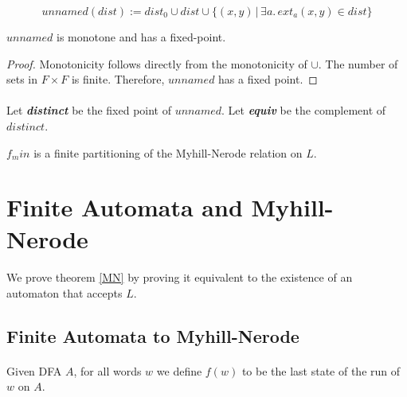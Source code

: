 \begin{definition}
    \begin{equation*}
        unnamed(dist) := dist_0 \cup dist \cup \{ (x,y) \, | \, \exists a. \, ext_a(x,y) \in dist\}
    \end{equation*}
\end{definition}

\begin{lemma}
    \label{dist_monotone}
    $unnamed$ is monotone and has a fixed-point.
\end{lemma}
\begin{proof}
    Monotonicity follows directly from the monotonicity of $\cup$. 
    The number of sets in $F \times F$ is finite. 
    Therefore, $unnamed$ has a fixed point.

\end{proof}
\paragraph{}
Let \textit{\textbf{distinct}} be the fixed point of $unnamed$.
Let \textit{\textbf{equiv}} be the complement of $distinct$.
\begin{theorem}
    \label{MN_MIN}
    $f_min$ is a finite partitioning of the Myhill-Nerode relation on $L$.
\end{theorem}




\section{Finite Automata and Myhill-Nerode}

\paragraph{}
We prove theorem \ref{MN} by proving it equivalent to the existence of an automaton that accepts $L$.



\subsection{Finite Automata to Myhill-Nerode}
\paragraph{}
Given DFA $A$, for all words $w$ we define $f(w)$ to be the last state of the run of $w$ on $A$.

